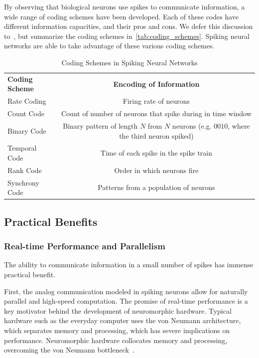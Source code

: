 \documentclass[fyp]{socreport}
\begin{document}
By observing that biological neurons use spikes to communicate information, a
wide range of coding schemes have been developed. Each of these codes have
different information capacities, and their pros and cons. We defer this
discussion to~\cite{thorpe2001spike}, but summarize the coding schemes
in~\autoref{tab:coding_schemes}. Spiking neural networks are able to take
advantage of these various coding schemes.

\begin{table}
  \centering
  \small
  \begin{tabular}{l|c}
    \hline
    \hline
    \textbf{Coding Scheme} & \textbf{Encoding of Information} \\
    Rate Coding & Firing rate of neurons \\
    Count Code & Count of number of neurons that spike during in time window \\
    Binary Code & Binary pattern of length $N$ from $N$ neurons (e.g. $0010$,
                  where the third neuron spiked) \\
    Temporal Code & Time of each spike in the spike
                    train \\
    Rank Code & Order in which neurons fire \\
    Synchrony Code & Patterns from a population of neurons \\
    \hline
    \hline
  \end{tabular}
  \normalsize
  \caption{Coding Schemes in Spiking Neural Networks}
  \label{tab:coding_schemes}
\end{table}

\subsection{Practical Benefits}

\subsubsection{Real-time Performance and Parallelism}
The ability to communicate information in a small number of spikes has immense
practical benefit.

First, the analog communication modeled in spiking neurons allow for naturally
parallel and high-speed computation. The promise of real-time performance is a
key motivator behind the development of neuromorphic hardware. Typical hardware
such as the everyday computer uses the von Neumann architecture, which separates
memory and processing, which has severe implications on performance.
Neuromorphic hardware collocates memory and processing, overcoming the von
Neumann bottleneck~\cite{Backus_1978}.
\end{document}
